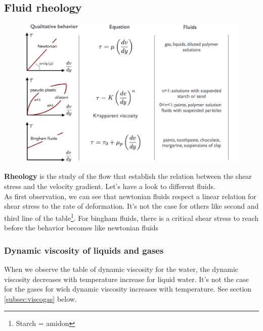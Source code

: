 \subsection{Fluid rheology}
\begin{figure}
	\vspace{-5mm}
	\includegraphics[scale=0.25]{ch1/7}
\end{figure}
\textbf{Rheology} is the study of the flow that establish the relation between the shear stress and the velocity gradient. Let's have a look to different fluids. \\
As first observation, we can see that newtonian fluids respect a linear relation for shear stress to the rate of deformation. It's not the case for others like second and third line of the table\footnote{Starch = amidon}. For bingham fluids, there is a critical shear stress to reach before the behavior becomes like newtonian fluids 
	
\subsubsection{Dynamic viscosity of liquids and gases}	
When we observe the table of dynamic viscosity for the water, the dynamic viscosity decreases with temperature increase for liquid water. It's not the case for the gases for wich dynamic viscosity increases with temperature. See section \ref{subsec:viscogas} below.
	
